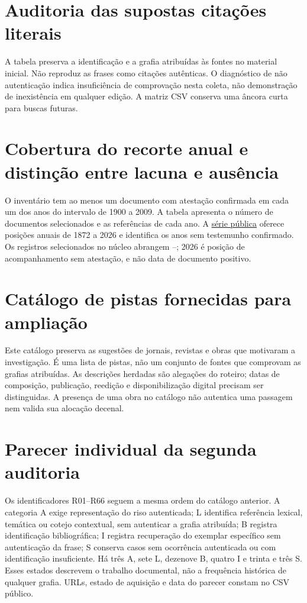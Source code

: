 \section{Auditoria das supostas citações literais}
A tabela preserva a identificação e a grafia atribuídas às fontes no material inicial. Não reproduz as frases como citações autênticas. O diagnóstico de não autenticação indica insuficiência de comprovação nesta coleta, não demonstração de inexistência em qualquer edição. A matriz CSV conserva uma âncora curta para buscas futuras.


\section{Cobertura do recorte anual e distinção entre lacuna e ausência}
O inventário tem ao menos um documento com atestação confirmada em cada um dos \AnnualCovered{} anos do intervalo de 1900 a 2009. A tabela apresenta o número de documentos selecionados e as referências de cada ano. A \href{https://github.com/murilloed/historia-riso-escrito-portugues/blob/main/data/annual_coverage.csv}{série pública} oferece posições anuais de 1872 a 2026 e identifica os anos sem testemunho confirmado. Os registros selecionados no núcleo abrangem \CoreMinYear{}--\CoreMaxYear{}; 2026 é posição de acompanhamento sem atestação, e não data de documento positivo.


\section{Catálogo de pistas fornecidas para ampliação}
Este catálogo preserva as sugestões de jornais, revistas e obras que motivaram a investigação. É uma lista de pistas, não um conjunto de fontes que comprovam as grafias atribuídas. As descrições herdadas são alegações do roteiro; datas de composição, publicação, reedição e disponibilização digital precisam ser distinguidas. A presença de uma obra no catálogo não autentica uma passagem nem valida sua alocação decenal.


\section{Parecer individual da segunda auditoria}
Os identificadores R01--R66 seguem a mesma ordem do catálogo anterior. A categoria A exige representação do riso autenticada; L identifica referência lexical, temática ou cotejo contextual, sem autenticar a grafia atribuída; B registra identificação bibliográfica; I registra recuperação do exemplar específico sem autenticação da frase; S conserva casos sem ocorrência autenticada ou com identificação insuficiente. Há três A, sete L, dezenove B, quatro I e trinta e três S. Esses estados descrevem o trabalho documental, não a frequência histórica de qualquer grafia. URLs, estado de aquisição e data do parecer constam no CSV público.


